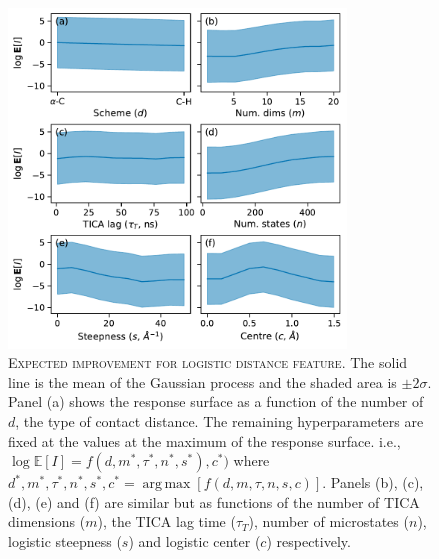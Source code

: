 \documentclass{article}
\DeclareMathOperator*{\argmax}{arg\,max}
\begin{document}
\begin{figure}
    \centering
    \includegraphics[width=0.8\textwidth]{figures/response_surface_marginal_distances_logistic_ei.pdf}
    \caption{\textsc{Expected improvement for logistic distance feature}. The solid line is the mean of the Gaussian process and the shaded area is $\pm 2\sigma$. Panel (a) shows the response surface as a function of the number of $d$, the type of contact distance. The remaining hyperparameters are fixed at the values at the maximum of the response surface. i.e., $\log{\mathbb{E}[I]}=f(d, m^{*}, \tau^{*}, n^{*}, s^{*}), c^{*})$ where $d^{*}, m^{*}, \tau^{*}, n^{*}, s^{*}, c^{*} = \argmax \left [f(d,  m, \tau,n, s, c)\right]$. Panels (b), (c), (d), (e) and (f) are similar but as functions of the number of TICA dimensions ($m$), the TICA lag time ($\tau_{T}$), number of microstates ($n$), logistic steepness ($s$) and logistic center ($c$) respectively.}
    \label{fig:repsonse_ei_logistic}
\end{figure}
\end{document}
